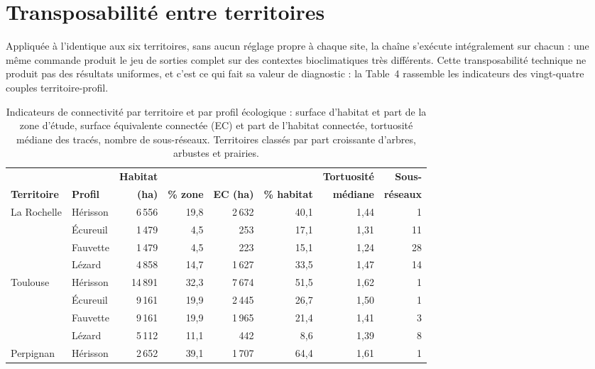 \documentclass[a4paper,12pt]{report}
\begin{document}
\section{Transposabilité entre territoires}
Appliquée à l'identique aux six territoires, sans aucun réglage propre à chaque site, la chaîne s'exécute intégralement sur chacun : une même commande produit le jeu de sorties complet sur des contextes bioclimatiques très différents. Cette transposabilité technique ne produit pas des résultats uniformes, et c'est ce qui fait sa valeur de diagnostic : la Table~4 rassemble les indicateurs des vingt-quatre couples territoire-profil.

\begin{table}[H]
\centering
\footnotesize
\setlength{\tabcolsep}{4pt}
\caption{Indicateurs de connectivité par territoire et par profil écologique : surface d'habitat et part de la zone d'étude, surface équivalente connectée (EC) et part de l'habitat connectée, tortuosité médiane des tracés, nombre de sous-réseaux. Territoires classés par part croissante d'arbres, arbustes et prairies.}
\begin{tabular}{@{}llrrrrrr@{}}
\toprule
 & & \multicolumn{1}{r}{\textbf{Habitat}} & & & & \multicolumn{1}{r}{\textbf{Tortuosité}} & \multicolumn{1}{r}{\textbf{Sous-}} \\
\textbf{Territoire} & \textbf{Profil} & \multicolumn{1}{r}{\textbf{(ha)}} & \multicolumn{1}{r}{\textbf{\% zone}} & \multicolumn{1}{r}{\textbf{EC (ha)}} & \multicolumn{1}{r}{\textbf{\% habitat}} & \multicolumn{1}{r}{\textbf{médiane}} & \multicolumn{1}{r}{\textbf{réseaux}} \\
\midrule
La Rochelle & Hérisson & 6\,556 & 19,8 & 2\,632 & 40,1 & 1,44 & 1 \\
 & Écureuil & 1\,479 & 4,5 & 253 & 17,1 & 1,31 & 11 \\
 & Fauvette & 1\,479 & 4,5 & 223 & 15,1 & 1,24 & 28 \\
 & Lézard & 4\,858 & 14,7 & 1\,627 & 33,5 & 1,47 & 14 \\
\addlinespace
Toulouse & Hérisson & 14\,891 & 32,3 & 7\,674 & 51,5 & 1,62 & 1 \\
 & Écureuil & 9\,161 & 19,9 & 2\,445 & 26,7 & 1,50 & 1 \\
 & Fauvette & 9\,161 & 19,9 & 1\,965 & 21,4 & 1,41 & 3 \\
 & Lézard & 5\,112 & 11,1 & 442 & 8,6 & 1,39 & 8 \\
\addlinespace
Perpignan & Hérisson & 2\,652 & 39,1 & 1\,707 & 64,4 & 1,61 & 1 \\

\end{tabular}
\end{table}
\end{document}
